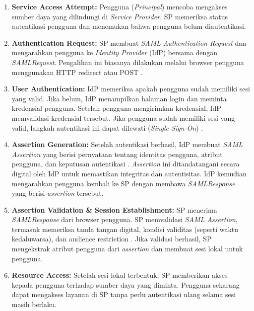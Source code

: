 \begin{enumerate}
    \item \textbf{Service Access Attempt:} Pengguna (\textit{Principal}) mencoba mengakses sumber daya yang dilindungi di \textit{Service Provider}. SP memeriksa status autentikasi pengguna dan menemukan bahwa pengguna belum diautentikasi.
    
    \item \textbf{Authentication Request:} SP membuat \textit{SAML Authentication Request} dan mengarahkan pengguna ke \textit{Identity Provider} (IdP) bersama dengan \textit{SAMLRequest}. Pengalihan ini biasanya dilakukan melalui browser pengguna menggunakan HTTP redirect atau POST \autocite{samlspec}.
    
    \item \textbf{User Authentication:} IdP memeriksa apakah pengguna sudah memiliki sesi yang valid. Jika belum, IdP menampilkan halaman login dan meminta kredensial pengguna. Setelah pengguna mengirimkan kredensial, IdP memvalidasi kredensial tersebut. Jika pengguna sudah memiliki sesi yang valid, langkah autentikasi ini dapat dilewati (\textit{Single Sign-On}) \autocite{CONRAD2023295}.
    
    \item \textbf{Assertion Generation:} Setelah autentikasi berhasil, IdP membuat \textit{SAML Assertion} yang berisi pernyataan tentang identitas pengguna, atribut pengguna, dan keputusan autentikasi \autocite{samlspec}. \textit{Assertion} ini ditandatangani secara digital oleh IdP untuk memastikan integritas dan autentisitas. IdP kemudian mengarahkan pengguna kembali ke SP dengan membawa \textit{SAMLResponse} yang berisi \textit{assertion} tersebut.
    
    \item \textbf{Assertion Validation \& Session Establishment:} SP menerima \textit{SAMLResponse} dari browser pengguna. SP memvalidasi \textit{SAML Assertion}, termasuk memeriksa tanda tangan digital, kondisi validitas (seperti waktu kedaluwarsa), dan audience restriction \autocite{samlspec}. Jika validasi berhasil, SP mengekstrak atribut pengguna dari \textit{assertion} dan membuat sesi lokal untuk pengguna.
    
    \item \textbf{Resource Access:} Setelah sesi lokal terbentuk, SP memberikan akses kepada pengguna terhadap sumber daya yang diminta. Pengguna sekarang dapat mengakses layanan di SP tanpa perlu autentikasi ulang selama sesi masih berlaku.
\end{enumerate}

